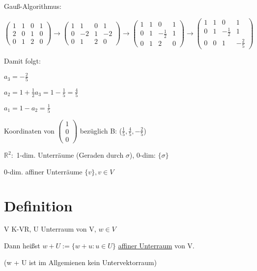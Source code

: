 \documentclass[a4paper, openany]{book}
\begin{document}
\begin{enumerate}[label=(\alph*)]
      Gauß-Algorithmus:

      $\begin{pmatrix} 1 & 1 & 0 & 1 \\ 2 & 0 & 1 & 0 \\ 0 & 1 & 2 & 0 \end{pmatrix} \rightarrow \begin{pmatrix}1 & 1 & 0 & 1 \\ 0 & -2 & 1 & -2 \\ 0 & 1 & 2 & 0 \end{pmatrix} \rightarrow \begin{pmatrix}1 & 1 & 0 & 1 \\ 0 & 1 & - \frac{1}{2} & 1 \\ 0 & 1 & 2 & 0 \end{pmatrix} \rightarrow \begin{pmatrix}1 & 1 & 0 & 1 \\ 0 & 1 & -\frac{1}{2} & 1 \\ 0 & 0 & 1 & - \frac{2}{5} \end{pmatrix}$

      Damit folgt:

      $a_3 = - \frac{2}{5}$

      $a_2 = 1 + \frac{1}{2} a_3 = 1 - \frac{1}{5} = \frac{4}{5}$

      $a_1 = 1 - a_2 = \frac{1}{5}$

      Koordinaten von $\begin{pmatrix}1 \\ 0 \\ 0 \end{pmatrix}$ bezüglich B: ($\frac{1}{5}, \frac{4}{5} , - \frac{2}{5}$)
    \end{enumerate}

    $\mathbb{R}^2:$ 1-dim. Unterräume (Geraden durch $\sigma$), 0-dim: $\{\sigma\}$

    0-dim. affiner Unterräume $\{v\}, v \in V$

    \section{Definition}

    V K-VR, U Unterraum von V, $w \in V$

    Dann heißst $w + U := \{w +u: u\in U\}$ \underline{affiner Unterraum} von V.

    (w + U ist im Allgemienen kein Untervektorraum)

    \par \medskip
\end{document}
